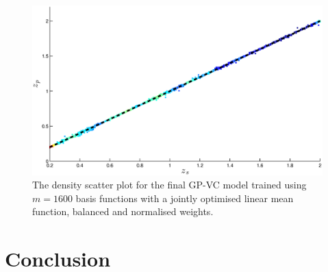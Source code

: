 \documentclass[useAMS,usenatbib,fleqn]{mn2e}
\begin{document}
\begin{figure}
       \centering
        \includegraphics[width=\columnwidth]{figures/final-1600.eps}
        \caption{The density scatter plot for the final GP-VC model trained using $m=1600$ basis functions with a jointly optimised linear mean function, balanced and normalised weights. }
       \label{fig-final-model}
\end{figure}

\section{Conclusion}
\label{sec-conclusion}
\end{document}
